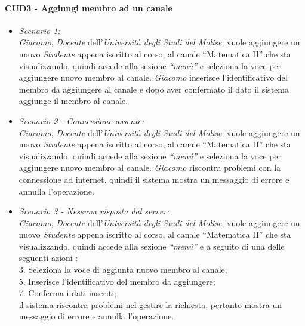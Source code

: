 \paragraph{CUD3 - Aggiungi membro ad un canale\\}
\begin{itemize}
	\item \textit{Scenario 1:\\}
	\textit{Giacomo}, \textit{Docente} dell’\textit{Università degli Studi del Molise}, vuole aggiungere un nuovo \textit{Studente} appena iscritto al corso, al canale “Matematica II” che sta visualizzando, quindi accede alla sezione \textit{“menù”} e seleziona la voce per aggiungere  nuovo membro al canale. \textit{Giacomo} inserisce l’identificativo del membro da aggiungere al canale e dopo aver confermato il dato il sistema aggiunge il membro al canale.\\
	
	\item \textit{Scenario 2 - Connessione assente:\\}
	\textit{Giacomo}, \textit{Docente} dell’\textit{Università degli Studi del Molise}, vuole aggiungere un nuovo \textit{Studente} appena iscritto al corso, al canale “Matematica II” che sta visualizzando, quindi accede alla sezione \textit{“menú”} e seleziona la voce per aggiungere  nuovo membro al canale. \textit{Giacomo} riscontra problemi con la connessione ad internet, quindi il sistema mostra un messaggio di errore e annulla l’operazione.\\
	
	\item \textit{Scenario 3 - Nessuna risposta dal server:\\}
	\textit{Giacomo}, \textit{Docente} dell’\textit{Università degli Studi del Molise}, vuole aggiungere un nuovo \textit{Studente} appena iscritto al corso, al canale “Matematica II” che sta visualizzando, quindi accede alla sezione \textit{“menú”} e a seguito di una delle seguenti azioni :\\
	3. Seleziona la voce di aggiunta nuovo membro al canale;\\
	5. Inserisce l’identificativo del membro da aggiungere;\\
	7. Conferma i dati inseriti;\\
	il sistema riscontra problemi nel gestire la richiesta, pertanto mostra un messaggio di errore e annulla l’operazione.
\end{itemize}

